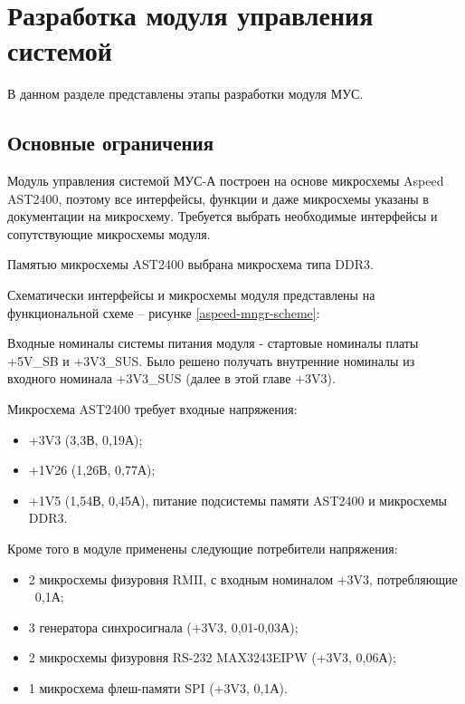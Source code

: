 \section{Разработка модуля управления системой}

В данном разделе представлены этапы разработки модуля МУС.

\subsection{Основные ограничения}

Модуль управления системой МУС-А построен на основе микросхемы Aspeed AST2400, поэтому все интерфейсы, функции и даже микросхемы указаны в документации на микросхему. Требуется выбрать необходимые интерфейсы и сопутствующие микросхемы модуля.

Памятью микросхемы AST2400 выбрана микросхема типа DDR3.

Схематически интерфейсы и микросхемы модуля представлены на функциональной схеме -- рисунке \ref{aspeed-mngr-scheme}:

Входные номиналы системы питания модуля - стартовые номиналы платы +5V\_SB и +3V3\_SUS. Было решено получать внутренние номиналы из входного номинала +3V3\_SUS (далее в этой главе +3V3).

Микросхема AST2400 требует входные напряжения:

\begin{itemize}
	\item +3V3 (3,3В, 0,19А);
	\item +1V26 (1,26В, 0,77А);
	\item +1V5 (1,54В, 0,45А), питание подсистемы памяти AST2400 и микросхемы DDR3.
\end{itemize}

Кроме того в модуле применены следующие потребители напряжения: 

\begin{itemize}
	\item 2 микросхемы физуровня RMII, с входным номиналом +3V3, потребляющие ~0,1А;
	\item 3 генератора синхросигнала (+3V3, 0,01-0,03А);
	\item 2 микросхемы физуровня RS-232 MAX3243EIPW (+3V3, 0,06А);
	\item 1 микросхема флеш-памяти SPI (+3V3, 0,1А).
\end{itemize}

